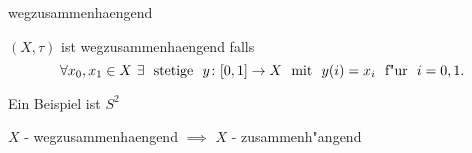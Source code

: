 \documentclass[class=article, crop=false]{standalone}
\begin{document}
\begin{zettel}{wegzusammenhaengend}
\begin{flashcard}
    \begin{definition}
    $(X,\tau)$ ist wegzusammenhaengend falls 
\[
    \forall x_0,x_1 \in  X \exists \tx{ stetige } y \from [0,1] \to X \tx{ mit } y(i)=  x_i \tx{ f"ur } i =  0,1
.\]
    \end{definition}
\end{flashcard}
    \begin{example}
    Ein Beispiel ist $S^2$ 
    \end{example}
    \begin{lemma}
    $X$ - wegzusammenhaengend $\implies $ $X$ - zusammenh"angend
    \end{lemma}
\end{zettel}
\end{document}
